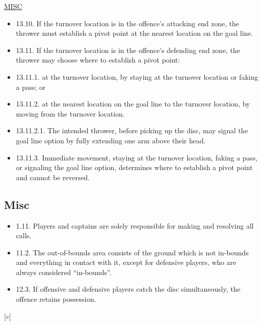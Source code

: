 \underline{\uppercase{Misc}}

\begin{itemize}
    \item 13.10. If the turnover location is in the offence’s attacking end zone, the thrower must establish a pivot point at the nearest location on the goal line.
    \item 13.11. If the turnover location is in the offence’s defending end zone, the thrower may choose where to establish a pivot point:
    \item 13.11.1. at the turnover location, by staying at the turnover location or faking a pass; or
    \item 13.11.2. at the nearest location on the goal line to the turnover location, by moving from the turnover location.
    \item 13.11.2.1. The intended thrower, before picking up the disc, may signal the goal line option by fully extending one arm above their head.
    \item 13.11.3. Immediate movement, staying at the turnover location, faking a pass, or signaling the goal line option, determines where to establish a pivot point and cannot be reversed.
\end{itemize}


\subsection*{Misc}

\begin{itemize}
    \item 1.11. Players and captains are solely responsible for making and resolving all calls.
    \item 11.2. The out-of-bounds area consists of the ground which is not in-bounds and everything in contact with it, except for defensive players, who are always considered “in-bounds”.
    \item 12.3. If offensive and defensive players catch the disc simultaneously, the offence retains possession.
\end{itemize}

\begin{center}[c]\end{center}
